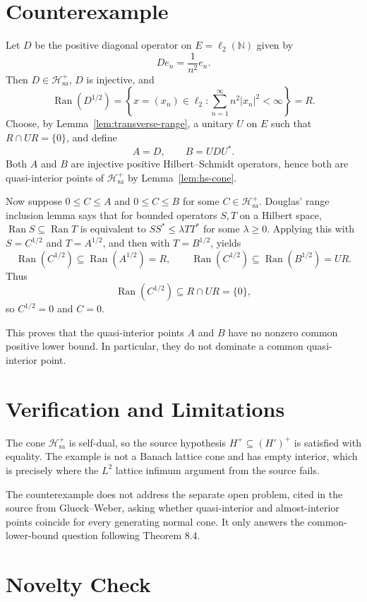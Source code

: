 \documentclass[11pt]{article}
\DeclareMathOperator{\Ran}{Ran}
\newcommand{\Hsa}{\mathcal H_{\mathrm{sa}}}
\newcommand{\N}{\mathbb N}
\begin{document}
\section*{Counterexample}

Let $D$ be the positive diagonal operator on $E=\ell_2(\N)$ given by
\[
        D e_n=\frac{1}{n^2}e_n.
\]
Then $D\in\Hsa^+$, $D$ is injective, and
\[
        \Ran(D^{1/2})
        =
        \left\{x=(x_n)\in\ell_2:\sum_{n=1}^\infty n^2 |x_n|^2<\infty\right\}
        =R.
\]
Choose, by Lemma~\ref{lem:transverse-range}, a unitary $U$ on $E$ such that $R\cap UR=\{0\}$, and define
\[
        A=D,\qquad B=UDU^*.
\]
Both $A$ and $B$ are injective positive Hilbert--Schmidt operators, hence both are quasi-interior points of $\Hsa^+$ by Lemma~\ref{lem:hs-cone}.

Now suppose $0\leq C\leq A$ and $0\leq C\leq B$ for some $C\in\Hsa^+$.  Douglas' range inclusion lemma says that for bounded operators $S,T$ on a Hilbert space, $\Ran S\subseteq\Ran T$ is equivalent to $SS^*\leq \lambda TT^*$ for some $\lambda\geq0$.  Applying this with $S=C^{1/2}$ and $T=A^{1/2}$, and then with $T=B^{1/2}$, yields
\[
        \Ran(C^{1/2})\subseteq \Ran(A^{1/2})=R,
        \qquad
        \Ran(C^{1/2})\subseteq \Ran(B^{1/2})=UR.
\]
Thus
\[
        \Ran(C^{1/2})\subseteq R\cap UR=\{0\},
\]
so $C^{1/2}=0$ and $C=0$.

This proves that the quasi-interior points $A$ and $B$ have no nonzero common positive lower bound.  In particular, they do not dominate a common quasi-interior point.

\section*{Verification and Limitations}

The cone $\Hsa^+$ is self-dual, so the source hypothesis $H^+\subseteq(H')^+$ is satisfied with equality.  The example is not a Banach lattice cone and has empty interior, which is precisely where the $L^2$ lattice infimum argument from the source fails.

The counterexample does not address the separate open problem, cited in the source from Glueck--Weber, asking whether quasi-interior and almost-interior points coincide for every generating normal cone.  It only answers the common-lower-bound question following Theorem 8.4.

\section*{Novelty Check}
\end{document}
